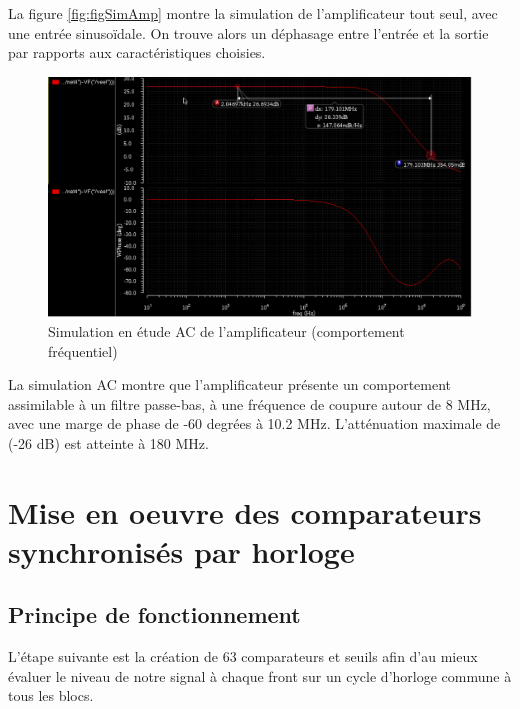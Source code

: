 \documentclass[11pt]{article}
\begin{document}
La figure \ref{fig:figSimAmp} montre la simulation de l'amplificateur tout seul, avec une entr\'ee
sinuso\"idale. On trouve alors un d\'ephasage entre l'entr\'ee et la sortie par rapports aux
caract\'eristiques choisies.

\begin{figure}[!htb]
\begin{center}
  \includegraphics[width=0.85\linewidth]{sim_EB_freq.png}
  \caption{Simulation en \'etude AC  de l'amplificateur (comportement fr\'equentiel)}
  \label{fig:figSimAmpAC}
\end{center}
\end{figure}

La simulation AC montre que l'amplificateur pr\'esente un comportement assimilable \`a un filtre passe-bas, \`a une fr\'equence de coupure autour de 8 MHz, avec une marge de phase de -60 degr\'ees \`a 10.2 MHz. L'att\'enuation maximale de (-26 dB) est atteinte \`a 180 MHz.

\clearpage

\section{Mise en oeuvre des comparateurs synchronis\'es par horloge}
\subsection{Principe de fonctionnement}
L'\'etape suivante est la cr\'eation de 63 comparateurs et seuils afin d'au mieux \'evaluer le niveau de
notre signal \`a chaque front sur un cycle d'horloge commune \`a tous les blocs.
\end{document}
